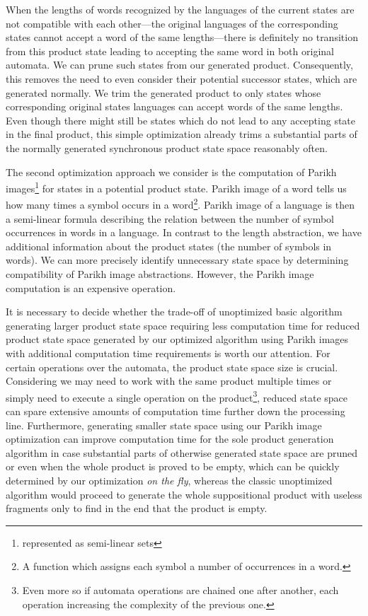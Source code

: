 When the lengths of words recognized by the languages of the current states are not compatible with each other---the original languages of the corresponding states cannot accept a word of the same lengths---there is definitely no transition from this product state leading to accepting the same word in both original automata. We can prune such states from our generated product. Consequently, this removes the need to even consider their potential successor states, which are generated normally. We trim the generated product to only states whose corresponding original states languages can accept words of the same lengths. Even though there might still be states which do not lead to any accepting state in the final product, this simple optimization already trims a substantial parts of the normally generated synchronous product state space reasonably often.


The second optimization approach we consider is the computation of Parikh images\footnote{represented as semi-linear sets} for states in a potential product state. Parikh image of a word tells us how many times a symbol occurs in a word\footnote{A function which assigns each symbol a number of occurrences in a word.}. Parikh image of a language is then a semi-linear formula describing the relation between the number of symbol occurrences in words in a language. In contrast to the length abstraction, we have additional information about the product states (the number of symbols in words). We can more precisely identify unnecessary state space by determining compatibility of Parikh image abstractions. However, the Parikh image computation is an expensive operation.

It is necessary to decide whether the trade-off of unoptimized basic algorithm generating larger product state space requiring less computation time for reduced product state space generated by our optimized algorithm using Parikh images with additional computation time requirements is worth our attention. For certain operations over the automata, the product state space size is crucial. Considering we may need to work with the same product multiple times or simply need to execute a single operation on the product\footnote{Even more so if automata operations are chained one after another, each operation increasing the complexity of the previous one.}, reduced state space can spare extensive amounts of computation time further down the processing line. Furthermore, generating smaller state space using our Parikh image optimization can improve computation time for the sole product generation algorithm in case substantial parts of otherwise generated state space are pruned or even when the whole product is proved to be empty, which can be quickly determined by our optimization \emph{on the fly}, whereas the classic unoptimized algorithm would proceed to generate the whole suppositional product with useless fragments only to find in the end that the product is empty.

